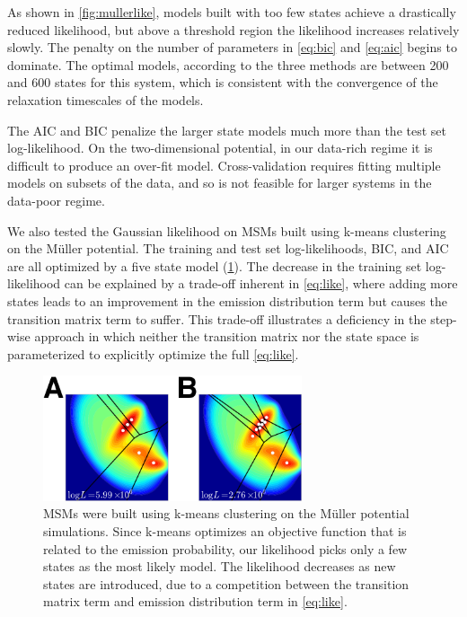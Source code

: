 \documentclass[journal=jpcbfk, layout=twocolumn, manuscript=article]{achemso}
\begin{document}
As shown in \cref{fig:mullerlike}, models built with too few states achieve a drastically reduced likelihood, but above a threshold region the likelihood increases relatively slowly. The penalty on the number of parameters in \cref{eq:bic} and \cref{eq:aic} begins to dominate. The optimal models, according to the three methods are between 200 and 600 states for this system, which is consistent with the convergence of the relaxation timescales of the models. 

The AIC and BIC penalize the larger state models much more than the test set log-likelihood. On the two-dimensional potential, in our data-rich regime it is difficult to produce an over-fit model. Cross-validation requires fitting multiple models on subsets of the data, and so is not feasible for larger systems in the data-poor regime.

We also tested the Gaussian likelihood on MSMs built using k-means clustering on the M\"uller potential. The training and test set log-likelihoods, BIC, and AIC are all optimized by a five state model (\cref{fig:kmeans_mull}). The decrease in the training set log-likelihood can be explained by a trade-off inherent in \cref{eq:like}, where adding more states leads to an improvement in the emission distribution term but causes the transition matrix term to suffer. This trade-off illustrates a deficiency in the step-wise approach in which neither the transition matrix nor the state space is parameterized to explicitly optimize the full \cref{eq:like}.

\begin{figure}
\centering
\includegraphics[width=3in]{figs_final/kmeans_like2_lbl.png}
\caption{MSMs were built using k-means clustering on the M\"uller potential simulations. Since k-means optimizes an objective function that is related to the emission probability, our likelihood picks only a few states as the most likely model. The likelihood decreases as new states are introduced, due to a competition between the transition matrix term and emission distribution term in \cref{eq:like}.}
\label{fig:kmeans_mull}
\end{figure}
\end{document}
